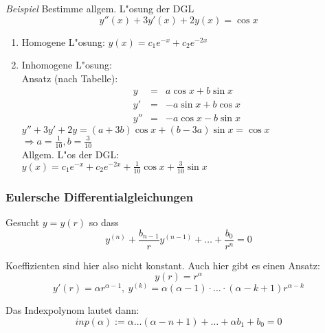 \documentclass[german, 10pt, a4paper, twocolumn]{scrartcl}
\theoremstyle{definition}
\begin{document}
\textit{Beispiel} Bestimme allgem. L"osung der DGL
$$y''(x)+3y'(x)+2y(x)=\cos x$$

\begin{enumerate}
 \item Homogene L"osung: $y(x)=c_1 e^{-x}+c_2 e^{-2x}$
 \item Inhomogene L"osung:\\
  Ansatz (nach Tabelle):
  \begin{eqnarray}
   y &	=& a\cos x+ b\sin x\nonumber \\
   y'&	=& -a\sin x + b\cos x \nonumber \\
   y''&	=& -a\cos x - b\sin x \nonumber 
  \end{eqnarray}
  $y''+3y'+2y=(a+3b)\cos x + (b-3a)\sin x = \cos x$\\
  $\Rightarrow a=\frac{1}{10}, b=\frac{3}{10}$\\
  Allgem. L"os der DGL:\\
  $y(x)=c_1e^{-x}+c_2e^{-2x}+\frac{1}{10}\cos x+\frac{3}{10}\sin x$
\end{enumerate}


\subsubsection{Eulersche Differentialgleichungen}

Gesucht $y=y(r)$ so dass
\begin{equation}
 \label{euler_diffgl}
 y^{(n)}+\frac{b_{n-1}}{r}y^{(n-1)}+\ldots+\frac{b_0}{r^n}=0
\end{equation}

Koeffizienten sind hier also nicht konstant. Auch hier gibt es einen Ansatz:
$$y(r)=r^\alpha$$
$$y'(r)=\alpha r^{\alpha-1},\:y^{(k)}=\alpha(\alpha -1)\cdotp\ldots\cdotp(\alpha -k+1)r^{\alpha - k}$$

Das Indexpolynom lautet dann:
$$inp(\alpha):=\alpha\ldots(\alpha-n+1)+\ldots+\alpha b_1+b_0=0$$
\end{document}
